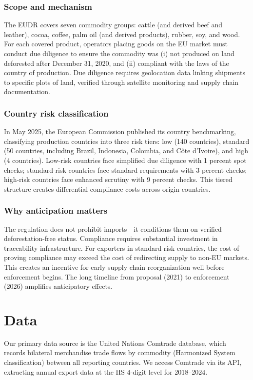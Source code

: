 \documentclass[12pt]{article}
\begin{document}
\subsubsection*{Scope and mechanism} The EUDR covers seven commodity groups: cattle (and derived beef and leather), cocoa, coffee, palm oil (and derived products), rubber, soy, and wood. For each covered product, operators placing goods on the EU market must conduct due diligence to ensure the commodity was (i) not produced on land deforested after December 31, 2020, and (ii) compliant with the laws of the country of production. Due diligence requires geolocation data linking shipments to specific plots of land, verified through satellite monitoring and supply chain documentation.

\subsubsection*{Country risk classification} In May 2025, the European Commission published its country benchmarking, classifying production countries into three risk tiers: low (140 countries), standard (50 countries, including Brazil, Indonesia, Colombia, and C\^ote d'Ivoire), and high (4 countries). Low-risk countries face simplified due diligence with 1 percent spot checks; standard-risk countries face standard requirements with 3 percent checks; high-risk countries face enhanced scrutiny with 9 percent checks. This tiered structure creates differential compliance costs across origin countries.

\subsubsection*{Why anticipation matters} The regulation does not prohibit imports---it conditions them on verified deforestation-free status. Compliance requires substantial investment in traceability infrastructure. For exporters in standard-risk countries, the cost of proving compliance may exceed the cost of redirecting supply to non-EU markets. This creates an incentive for early supply chain reorganization well before enforcement begins. The long timeline from proposal (2021) to enforcement (2026) amplifies anticipatory effects.


\section{Data}

Our primary data source is the United Nations Comtrade database, which records bilateral merchandise trade flows by commodity (Harmonized System classification) between all reporting countries. We access Comtrade via its API, extracting annual export data at the HS 4-digit level for 2018--2024.
\end{document}
